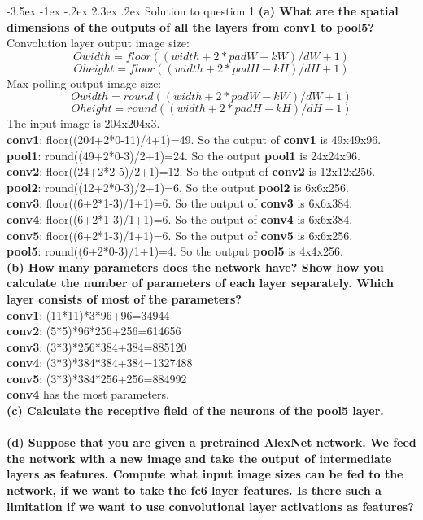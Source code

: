 \documentclass[12pt]{article}
\makeatletter
\renewcommand\section{\@startsection {section}{1}{\z@}%
	{-3.5ex \@plus -1ex \@minus -.2ex}%
	{2.3ex \@plus.2ex}%
	{\normalfont\large\bfseries}}%
\makeatother
\begin{document}
	\section{Solution to question 1}
	\textbf{(a) What are the spatial dimensions of the outputs of all the layers from conv1 to pool5?}\\
	Convolution layer output image size:\\
	$$Owidth = floor((width + 2*padW - kW) / dW + 1)$$
	$$Oheight = floor((width + 2*padH - kH) / dH+ 1)$$
	Max polling output image size:\\
	$$Owidth = round((width + 2*padW - kW) / dW + 1)$$
	$$Oheight = round((width + 2*padH - kH) / dH+ 1)$$
	\noindent
	The input image is 204x204x3.\\
	\textbf{conv1}: floor((204+2*0-11)/4+1)=49. So the output of \textbf{conv1} is 49x49x96.\\
	\textbf{pool1}: round((49+2*0-3)/2+1)=24. So the output \textbf{pool1} is 24x24x96.\\
	\textbf{conv2}: floor((24+2*2-5)/2+1)=12. So the output of \textbf{conv2} is 12x12x256.\\
	\textbf{pool2}: round((12+2*0-3)/2+1)=6. So the output \textbf{pool2} is 6x6x256.\\
	\textbf{conv3}: floor((6+2*1-3)/1+1)=6. So the output of \textbf{conv3} is 6x6x384.\\
	\textbf{conv4}: floor((6+2*1-3)/1+1)=6. So the output of \textbf{conv4} is 6x6x384.\\
	\textbf{conv5}: floor((6+2*1-3)/1+1)=6. So the output of \textbf{conv5} is 6x6x256.\\
	\textbf{pool5}: round((6+2*0-3)/1+1)=4. So the output \textbf{pool5} is 4x4x256.\\
	\noindent
	\textbf{(b) How many parameters does the network have? Show how you calculate the number of parameters of each layer separately. Which layer consists of most of the parameters?}\\
	\textbf{conv1}: (11*11)*3*96+96=34944\\
	\textbf{conv2}: (5*5)*96*256+256=614656\\
	\textbf{conv3}: (3*3)*256*384+384=885120\\
	\textbf{conv4}: (3*3)*384*384+384=1327488\\
	\textbf{conv5}: (3*3)*384*256+256=884992\\
	\textbf{conv4} has the most parameters.\\
	\noindent
	\textbf{(c) Calculate the receptive field of the neurons of the pool5 layer.}\\
	\\
	\textbf{(d) Suppose that you are given a pretrained AlexNet network. We feed the network with a new image and take the output of intermediate layers as features. Compute what input image sizes can be fed to the network, if we want to take the fc6 layer features. Is there such a limitation if we want to use convolutional layer activations as features?}\\
	\\
	
\end{document}
